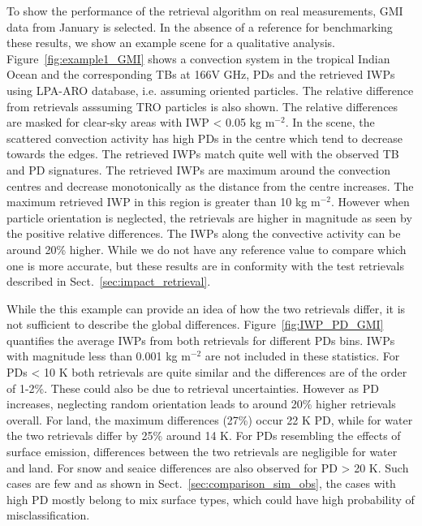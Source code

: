 \documentclass[amt, manuscript]{copernicus}
\begin{document}
To show the performance of the retrieval algorithm on real measurements, GMI data from January is selected. In the absence of a reference for benchmarking these results, we show an example scene for a qualitative analysis. Figure~\ref{fig:example1_GMI} shows a convection system in the tropical Indian Ocean and the corresponding TBs at 166V GHz, PDs and the retrieved IWPs using LPA-ARO database, i.e. assuming oriented particles. The relative difference from retrievals asssuming TRO particles is also shown. The relative differences are masked for clear-sky areas with IWP < 0.05 kg m$^{-2}$. In the scene, the scattered convection activity has high PDs in the centre which tend to decrease towards the edges. The retrieved IWPs match quite well with the observed TB and PD signatures. The retrieved IWPs are maximum around the convection centres and decrease monotonically as the distance from the centre increases. The maximum retrieved IWP in this region is greater than 10\,\,kg m$^{-2}$. However when particle orientation is neglected, the retrievals are higher in magnitude as seen by the positive relative differences. The IWPs along the convective activity can be around 20\% higher. While we do not have any reference value to compare which one is more accurate, but these results are in conformity with the test retrievals described in  Sect.~\ref{sec:impact_retrieval}.


While the this example can provide an idea of how the two retrievals differ, it is not sufficient to describe the global differences. Figure~\ref{fig:IWP_PD_GMI} quantifies the average IWPs from both retrievals for different PDs bins. IWPs with magnitude less than 0.001\,\,kg m$^{-2}$ are not included in these statistics. For PDs < 10\,\,K both retrievals are quite similar and the differences are of the order of 1-2\%. These could also be due to retrieval uncertainties. However as PD increases, neglecting random orientation leads to around 20\% higher retrievals overall. For land, the maximum differences (27\%) occur 22\,\,K PD, while for water the two retrievals differ by 25\% around 14\,\,K. For PDs resembling the effects of surface emission, differences between the two retrievals are negligible for water and land. For snow and seaice differences are also observed for PD > 20\,\,K.  Such cases are few and as shown in Sect.~\ref{sec:comparison_sim_obs}, the cases with high PD mostly belong to mix surface types, which could have high probability of misclassification.
\end{document}
